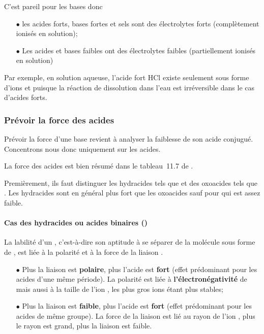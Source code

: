 C'est pareil pour les bases donc
\begin{itemize}
  \item[$\bullet$] les acides forts,
    bases fortes et sels sont des électrolytes forts
    (complètement ionisés en solution);
  \item[$\bullet$] Les acides et bases faibles ont des électrolytes faibles
    (partiellement ionisés en solution)
\end{itemize}
Par exemple, en solution aqueuse, l'acide fort HCl existe seulement
sous forme d'ions  et  puisque la réaction de dissolution dans
l'eau est irréversible dans le cas d'acides forts.

\subsubsection{Prévoir la force des acides}
Prévoir la force d'une base revient à analyser la faiblesse de
son acide conjugué.
Concentrons nous donc uniquement sur les acides.

La force des acides est bien résumé dans le tableau~11.7 de
\cite[p.~444]{atkins2011principes}.

Premièrement, ils faut distinguer les hydracides tels que  et 
des oxoacides tels que .
Les hydracides sont en général plus fort que les oxoacides sauf pour
 qui est assez faible.

\paragraph{Cas des hydracides ou acides binaires ()}
La labilité d'un ,
c'est-à-dire son aptitude à se séparer de la
molécule  sous forme de ,
est liée à la polarité et à la force de la liaison .
\begin{itemize}
  \item[$\bullet$] Plus la liaison est \textbf{polaire},
    plus l'acide est \textbf{fort}
    (effet prédominant pour les acides d'une même période).
    La polarité est liée à \textbf{l'électronégativité} de
     mais aussi à la taille de l'ion ,
    les plus gros ions étant plus stables;
  \item[$\bullet$] Plus la liaison est \textbf{faible},
    plus l'acide est \textbf{fort}
    (effet prédominant pour les acides de même groupe).
    La force de la liaison est lié au rayon de l'ion ,
    plus le rayon est grand, plus la liaison est faible.
\end{itemize}

